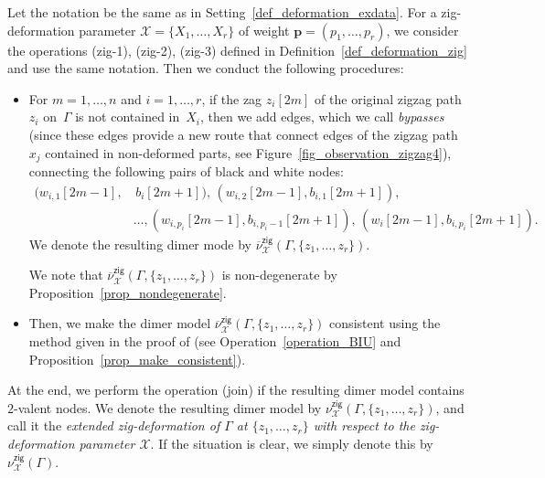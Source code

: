 \documentclass[11pt]{article}
\numberwithin{equation}{section}
\numberwithin{equation}{section}
\numberwithin{figure}{section}
\numberwithin{table}{section}
\newcommand{\calX}{\mathcal{X}}
\newcommand{\bfp}{\mathbf{p}}
\newcommand{\zig}{\mathsf{zig}}
\begin{document}
\begin{Definition}\label{def_exdeformation_zig}
Let the notation be the same as in Setting~\ref{def_deformation_exdata}.
For a zig-deformation parameter $\calX=\{X_1,\dots,X_r\}$ of weight $\bfp=(p_1,\dots,p_r)$, we consider
the operations (zig-1), (zig-2), (zig-3) defined in Definition~\ref{def_deformation_zig} and use the same notation.
Then we conduct the following procedures:
\begin{itemize}\itemsep=0pt
\setlength{\parskip}{0pt}
\setlength{\leftskip}{0.3cm}
\item[(\text{zig}-4)]
For $m=1,\dots,n$ and $i=1, \dots, r$, if the zag $z_i[2m]$ of the original zigzag path~$z_i$ on~$\Gamma$ is not contained in~$X_i$,
then we add edges, which we call \emph{bypasses}
(since these edges provide a new route that connect edges of the zigzag path $x_j$ contained in non-deformed parts, see Figure~\ref{fig_observation_zigzag4}),
connecting the following pairs of black and white nodes:
\begin{align*}
(w_{i,1}[2m-1], &\, b_i[2m+1]), \,(w_{i,2}[2m-1],b_{i,1}[2m+1]), \\ &\dots, (w_{i,p_i}[2m-1],b_{i,p_i-1}[2m+1]),\, (w_i[2m-1],b_{i,p_i}[2m+1]).
\end{align*}
We denote the resulting dimer mode by $\overline{\nu}^\zig_\calX(\Gamma, \{z_1,\dots,z_r\})$.

We note that $\overline{\nu}^\zig_\calX(\Gamma, \{z_1,\dots,z_r\})$ is non-degenerate by Proposition~\ref{prop_nondegenerate}.
\item[(\text{zig}-5)]
Then, we make the dimer model $\overline{\nu}^\zig_\calX(\Gamma, \{z_1,\dots,z_r\})$ consistent using the method given in the proof of \cite[Theorem~1.1]{BIU} (see Operation~\ref{operation_BIU} and Proposition~\ref{prop_make_consistent}).
\end{itemize}

At the end, we perform the operation (join) if the resulting dimer model contains $2$-valent nodes.
We denote the resulting dimer model by $\nu^\zig_\calX(\Gamma, \{z_1,\dots,z_r\})$,
and call it the \emph{extended zig-deformation of $\Gamma$ at $\{z_1,\dots,z_r\}$ with respect to the zig-deformation parameter $\calX$}.
If the situation is clear, we simply denote this by $\nu^\zig_\calX(\Gamma)$.
\end{Definition}
\end{document}
